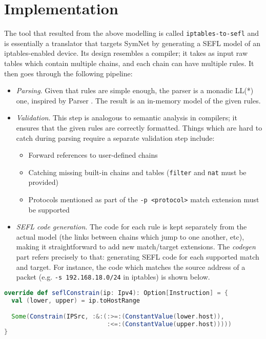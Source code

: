 \documentclass[twoside, 11pt, a4paper]{article}
\begin{document}
\section{Implementation}
The tool that resulted from the above modelling is called
\texttt{iptables-to-sefl} \cite{github-repo} and is essentially a translator
that targets SymNet by generating a SEFL model of an iptables-enabled device.
Its design resembles a compiler; it takes as input raw tables which contain
multiple chains, and each chain can have multiple rules.  It then goes through
the following pipeline:

\begin{itemize}
  \item \emph{Parsing}.  Given that rules are simple enough, the parser is a
    monadic LL(*) one, inspired by Parser \cite{leijen2002parsec}.  The result
    is an in-memory model of the given rules.
  \item \emph{Validation}.  This step is analogous to semantic analysis in
    compilers; it ensures that the given rules are correctly formatted.  Things
    which are hard to catch during parsing require a separate validation step
    include:
    \begin{itemize}
      \item Forward references to user-defined chains
      \item Catching missing built-in chains and tables (\texttt{filter} and
        \texttt{nat} must be provided)
      \item Protocols mentioned as part of the \texttt{-p <protocol>} match
        extension must be supported
    \end{itemize}
  \item \emph{SEFL code generation}.  The code for each rule is kept separately
    from the actual model (the links between chains which jump to one another,
    etc), making it straightforward to add new match/target extensions.  The
    \emph{codegen} part refers precisely to that: generating SEFL code for each
    supported match and target.  For instance, the code which matches the
    source address of a packet (e.g. \texttt{-s 192.168.18.0/24} in iptables)
    is shown below.
\end{itemize}

\begin{lstlisting}[language=scala,label={codegen}]
override def seflConstrain(ip: Ipv4): Option[Instruction] = {
  val (lower, upper) = ip.toHostRange

  Some(Constrain(IPSrc, :&:(:>=:(ConstantValue(lower.host)),
                            :<=:(ConstantValue(upper.host)))))
}
\end{lstlisting}
\end{document}
